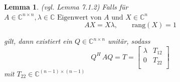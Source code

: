 \documentclass[a4paper,12pt]{report}
\newcommand{\C}{\mathbb C}
\newcommand{\rang}{\text{rang}}
\theoremstyle{plain} %
\newtheorem{lemma}[theorem]{Lemma}  %
\theoremstyle{definition} %
\theoremstyle{remark}
\begin{document}
            \begin{lemma}(vgl. Lemma 7.1.2\cite[S. 312]{matrixGolub})
                  \label{lemma: Hilfe Schur}
                  Falls für $A\in\C^{n\times n}, \lambda\in \C \text{ Eigenwert von }A\text{ und }X\in \C^{n}$
                  \begin{equation}
                        \label{eqn: Hilfslemma Schur_Bed}
                        AX = X\lambda,\qquad \rang(X)=1
                  \end{equation}
                  
                  gilt, dann existiert ein $Q\in \C^{n\times n}$ unitär, sodass
                  $$Q^H\,AQ = T =  \begin{bmatrix}
                        \lambda & T_{12} \\
                        0 & T_{22} \\
                        \end{bmatrix}$$
                  mit $T_{22}\in \C^{(n-1)\times(n-1)}$
            \end{lemma}
\end{document}
